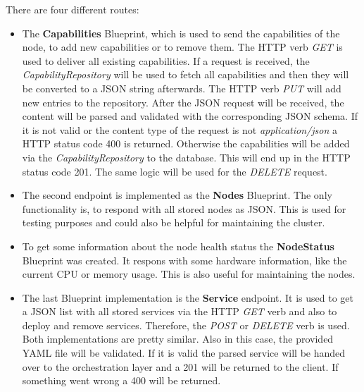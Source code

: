 There are four different routes:
\begin{itemize}
  \item The \textbf{Capabilities} Blueprint, which is used to send the capabilities of the node, to add new capabilities or to remove them.
  The \ac{HTTP} verb \textit{GET} is used to deliver all existing capabilities.
  If a request is received, the \textit{CapabilityRepository} will be used to fetch all capabilities and then they will be converted to a JSON string afterwards.
  The \ac{HTTP} verb \textit{PUT} will add new entries to the repository.
  After the \ac{JSON} request will be received, the content will be parsed and validated with the corresponding \ac{JSON} schema.
  If it is not valid or the content type of the request is not \textit{application/json} a \ac{HTTP} status code 400 is returned.
  Otherwise the capabilities will be added via the \textit{CapabilityRepository} to the database.
  This will end up in the \ac{HTTP} status code 201.
  The same logic will be used for the \textit{DELETE} request.
  \item The second endpoint is implemented as the \textbf{Nodes} Blueprint.
  The only functionality is, to respond with all stored nodes as \ac{JSON}.
  This is used for testing purposes and could also be helpful for maintaining the cluster.
  \item To get some information about the node health status the \textbf{NodeStatus} Blueprint was created.
  It respons with some hardware information, like the current \ac{CPU} or memory usage.
  This is also useful for maintaining the nodes.
  \item The last Blueprint implementation is the \textbf{Service} endpoint.
  It is used to get a \ac{JSON} list with all stored services via the \ac{HTTP} \textit{GET} verb and also to deploy and remove services.
  Therefore, the \textit{POST} or \textit{DELETE} verb is used.
  Both implementations are pretty similar.
  Also in this case, the provided \ac{YAML} file will be validated.
  If it is valid the parsed service will be handed over to the orchestration layer and a 201 will be returned to the client.
  If something went wrong a 400 will be returned.
\end{itemize}

